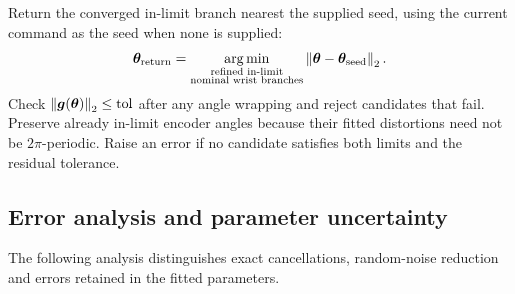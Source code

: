 \documentclass[../main.tex]{subfiles}
\begin{document}
Return the converged in-limit branch nearest the supplied seed, using the current command as the seed when none is supplied:
\begin{equation*}
\bm{\theta}_{\mathrm{return}}
=\underset{\substack{\text{refined in-limit}\\\text{nominal wrist branches}}}{\arg\min}
\left\|\bm{\theta}-\bm{\theta}_{\mathrm{seed}}\right\|_2.
\end{equation*}
Check $\left\|\bm{g}(\bm{\theta})\right\|_2\leq\mathrm{tol}$ after any angle wrapping and reject candidates that fail. Preserve already in-limit encoder angles because their fitted distortions need not be $2\pi$-periodic. Raise an error if no candidate satisfies both limits and the residual tolerance.

\subsection{Error analysis and parameter uncertainty}\label{sec:math-errors}
The following analysis distinguishes exact cancellations, random-noise reduction and errors retained in the fitted parameters.
\end{document}
